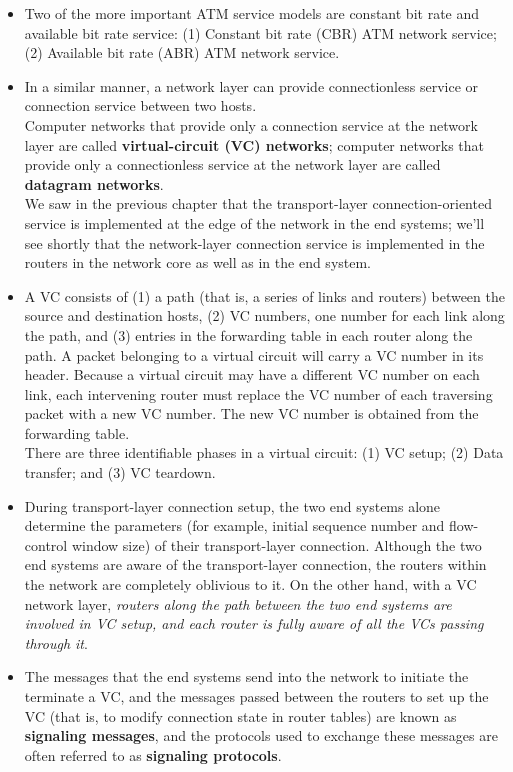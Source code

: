 \begin{itemize}
\item
Two of the more important ATM service models are constant bit rate and available bit rate service: (1) Constant bit rate (CBR) ATM network service; (2) Available bit rate (ABR) ATM network service.

\item
In a similar manner, a network layer can provide connectionless service or connection service between two hosts.\\
Computer networks that provide only a connection service at the network layer are called \textbf{virtual-circuit (VC) networks}; computer networks that provide only a connectionless service at the network layer are called \textbf{datagram networks}.\\
We saw in the previous chapter that the transport-layer connection-oriented service is implemented at the edge of the network in the end systems; we'll see shortly that the network-layer connection service is implemented in the routers in the network core as well as in the end system.

\item
A VC consists of (1) a path (that is, a series of links and routers) between the source and destination hosts, (2) VC numbers, one number for each link along the path, and (3) entries in the forwarding table in each router along the path. A packet belonging to a virtual circuit will carry a VC number in its header. Because a virtual circuit may have a different VC number on each link, each intervening router must replace the VC number of each traversing packet with a new VC number. The new VC number is obtained from the forwarding table.\\
There are three identifiable phases in a virtual circuit: (1) VC setup; (2) Data transfer; and (3) VC teardown.

\item
During transport-layer connection setup, the two end systems alone determine the parameters (for example, initial sequence number and flow-control window size) of their transport-layer connection. Although the two end systems are aware of the transport-layer connection, the routers within the network are completely oblivious to it. On the other hand, with a VC network layer, \textit{routers along the path between the two end systems are involved in VC setup, and each router is fully aware of all the VCs passing through it}.

\item
The messages that the end systems send into the network to initiate the terminate a VC, and the messages passed between the routers to set up the VC (that is, to modify connection state in router tables) are known as \textbf{signaling messages}, and the protocols used to exchange these messages are often referred to as \textbf{signaling protocols}.


\end{itemize}
